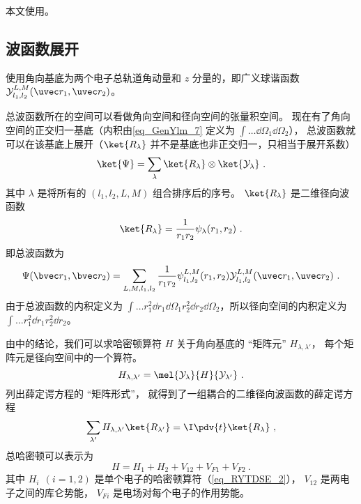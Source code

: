 

本文使用。

\subsection{波函数展开}
使用角向基底为两个电子总轨道角动量和 $z$ 分量的，即广义球谐函数 $\mathcal{Y}_{l_1,l_2}^{L,M}(\uvec r_1, \uvec r_2)$。

总波函数所在的空间可以看做角向空间和径向空间的张量积空间。 现在有了角向空间的正交归一基底（内积由\autoref{eq_GenYlm_7} 定义为 $\int \dots \dd{\Omega_1} \dd{\Omega_2}$）， 总波函数就可以在该基底上展开（$\ket{R_\lambda}$ 并不是基底也非正交归一，只相当于展开系数）
\begin{equation}
\ket{\Psi} = \sum_\lambda \ket{R_\lambda}\otimes\ket{\mathcal{Y_\lambda}}~.
\end{equation}
其中 $\lambda$ 是将所有的 $(l_1,l_2,L,M)$ 组合排序后的序号。 $\ket{R_\lambda}$ 是二维径向波函数
\begin{equation}\label{eq_HeTDSE_6}
\ket{R_\lambda} = \frac{1}{r_1 r_2} \psi_\lambda(r_1, r_2)~.
\end{equation}
即总波函数为
\begin{equation}\label{eq_HeTDSE_2}
\Psi(\bvec r_1, \bvec r_2) = \sum_{L, M, l_1, l_2}  \frac{1}{r_1 r_2} \psi_{l_1, l_2}^{L, M}(r_1, r_2)\mathcal{Y}_{l_1, l_2}^{L, M}(\uvec r_1, \uvec r_2)~.
\end{equation}
由于总波函数的内积定义为 $\int \dots r_1^2\dd{r_1}\dd{\Omega_1} r_2^2\dd{r_2}\dd{\Omega_2}$，所以径向空间的内积定义为 $\int \dots r_1^2 \dd{r_1} r_2^2\dd{r_2}$。

由中的结论，我们可以求哈密顿算符 $H$ 关于角向基底的 “矩阵元” $H_{\lambda, \lambda'}$， 每个矩阵元是径向空间中的一个算符。
\begin{equation}
H_{\lambda, \lambda'} = \mel{\mathcal{Y}_{\lambda}}{H}{\mathcal{Y}_{\lambda'}}~.
\end{equation}
列出薛定谔方程的 “矩阵形式”， 就得到了一组耦合的二维径向波函数的薛定谔方程
\begin{equation}\label{eq_HeTDSE_8}
\sum_{\lambda'} H_{\lambda, \lambda'} \ket{R_{\lambda'}} = \I \pdv{t} \ket{R_{\lambda}}~,
\end{equation}
总哈密顿可以表示为
\begin{equation}\label{eq_HeTDSE_7}
H = H_1 + H_2 + V_{12} + V_{F1} + V_{F2}~.
\end{equation}
其中 $H_i \ \ (i = 1, 2)$ 是单个电子的哈密顿算符（\autoref{eq_RYTDSE_2}）， $V_{12}$ 是两电子之间的库仑势能， $V_{Fi}$ 是电场对每个电子的作用势能。

